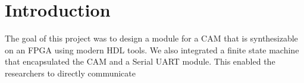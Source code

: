 \section{Introduction}
The goal of this project was to design a module for a CAM that is synthesizable on an FPGA using modern HDL tools. 
We also integrated a finite state machine that encapsulated the CAM and a Serial UART module. 
This enabled the researchers to directly communicate 